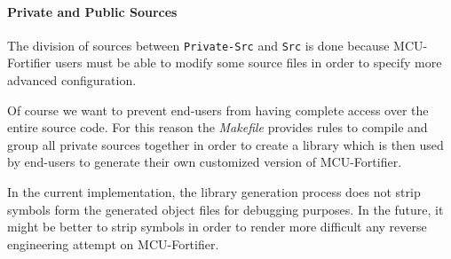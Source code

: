 \documentclass{article}
\begin{document}
\paragraph{Private and Public Sources}
The division of sources between \verb|Private-Src| and \verb|Src| is done because MCU-Fortifier users must be able to modify some source files in order to specify more advanced configuration.

Of course we want to prevent end-users from having complete access over the entire source code. For this reason the \textit{Makefile} provides rules to compile and group all private sources together in order to create a library which is then used by end-users to generate their own customized version of MCU-Fortifier.

In the current implementation, the library generation process does not strip symbols form the generated object files for debugging purposes. In the future, it might be better to strip symbols in order to render more difficult any reverse engineering attempt on MCU-Fortifier.
\end{document}
